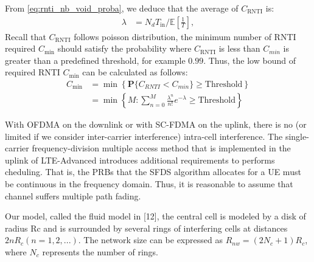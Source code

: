 From \eqref{eq:rnti_nb_void_proba}, we deduce that the average of $C_{\text{RNTI}}$ is:
\begin{align}
	\lambda &= N_{d} T_{\text{in}}/\mathbb{E} \left[ \frac{1}{T} \right],
\end{align}
Recall that $C_{\text{RNTI}}$  follows poisson distribution, the minimum number of RNTI required $C_{\text{min}}$ should satisfy the probability where $C_{\text{RNTI}}$ is less than $C_{min}$ is greater than a predefined threshold, for example $0.99$. Thus, the low bound of required RNTI $C_{\text{min}}$ can be calculated as follows:
\begin{align}	
\label{eq:low-bound-rach}
C_{\text{min}} &= \min \left\lbrace \mathbf{P} \{ C_{RNTI} < C_{min} \} \geq \text{Threshold} \right\rbrace \nonumber \\
&= \min \left\lbrace M: \sum_{n=0}^{M} \frac{\lambda ^ n }{ n! } e^{-\lambda} \geq \text{Threshold} \right\rbrace 
\end{align}






With OFDMA on the downlink or with SC-FDMA on the uplink, there is no (or limited if we consider inter-carrier interference) intra-cell interference. The single-carrier frequency-division multiple access method that is implemented in the uplink of LTE-Advanced introduces additional requirements to performs cheduling. That is, the PRBs that the SFDS algorithm allocates for a UE must be continuous in the frequency domain. Thus, it is reasonable to assume that channel suffers multiple path fading.


Our model, called the fluid model in [12], the central cell is modeled by a disk of radius Rc and is surrounded by several rings of interfering cells at distances $2nR_c (n =1, 2, ...)$. The network size can be expressed as $R_{nw} =(2N_c+1)R_c$, where $N_c$ represents the number of rings.




